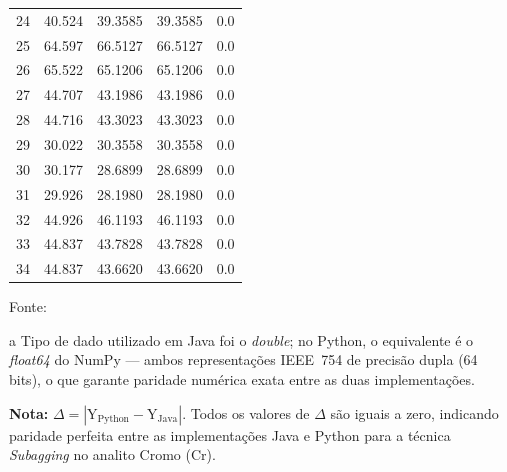\begin{table}[H]
\begin{threeparttable}
{\begin{tabular}{
    S[table-format=2.0]
    S[table-format=2.3]
    S[table-format=2.4]
    S[table-format=2.4]
    S[table-format=1.1]
}
24  & 40.524  & 39.3585  & 39.3585  & 0.0 \\
25  & 64.597  & 66.5127  & 66.5127  & 0.0 \\
26  & 65.522  & 65.1206  & 65.1206  & 0.0 \\
27  & 44.707  & 43.1986  & 43.1986  & 0.0 \\
28  & 44.716  & 43.3023  & 43.3023  & 0.0 \\
29  & 30.022  & 30.3558  & 30.3558  & 0.0 \\
30  & 30.177  & 28.6899  & 28.6899  & 0.0 \\
31  & 29.926  & 28.1980  & 28.1980  & 0.0 \\
32  & 44.926  & 46.1193  & 46.1193  & 0.0 \\
33  & 44.837  & 43.7828  & 43.7828  & 0.0 \\
34  & 44.837  & 43.6620  & 43.6620  & 0.0 \\
\bottomrule
\end{tabular}%
}
\begin{center}
\begin{minipage}{0.85\linewidth}
\begin{tablenotes}
\footnotesize
\item Fonte:~\oautor
\item[a] Tipo de dado utilizado em Java foi o \textit{double}; no Python,
o equivalente é o \textit{float64} do NumPy — ambos representações IEEE~754
de precisão dupla (64 bits), o que garante paridade numérica exata entre as
duas implementações.
\item \textbf{Nota:} $\Delta = |\text{Y}_{\text{Python}} - \text{Y}_{\text{Java}}|$.
Todos os valores de $\Delta$ são iguais a zero, indicando paridade
perfeita entre as implementações Java e Python para a técnica \textit{Subagging}
no analito Cromo (Cr).
\end{tablenotes}
\end{minipage}
\end{center}
\end{threeparttable}
\end{table}

